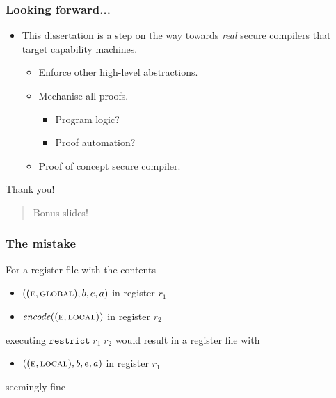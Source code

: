 \documentclass[14pt]{beamer}
\begin{document}
\begin{frame}
  \frametitle{Looking forward...}
  \begin{itemize}
  \item This dissertation is a step on the way towards \emph{real} secure compilers that target capability machines. 
    \begin{itemize}
      \item<2-> Enforce other high-level abstractions.
      \item<3-> Mechanise all proofs.
        \begin{itemize}
          \item<4-> Program logic?
          \item<4-> Proof automation?
      \end{itemize}
      \item<5-> Proof of concept secure compiler.
    \end{itemize}
  \end{itemize}
\end{frame}

\begin{frame}
  \centering

  \huge Thank you!
\end{frame}
\appendix
\begin{frame}
  \begin{center}
    \begin{quote}
      \Huge Bonus slides!
    \end{quote}
  \end{center}
\end{frame}

\begin{frame}
  \frametitle{The mistake}
  For a register file with the contents
  \begin{itemize}
  \item $((\textsc{e},\textsc{global}),b,e,a)$ in register $r_1$
  \item $\mathit{encode}((\textsc{e},\textsc{local}))$ in register $r_2$
  \end{itemize}
  executing $\texttt{restrict}\;r_1\;r_2$ would result in a register file with
  \begin{itemize}
  \item $((\textsc{e},\textsc{local}),b,e,a)$ in register $r_1$
  \end{itemize}
  seemingly fine
\end{frame}
\end{document}
